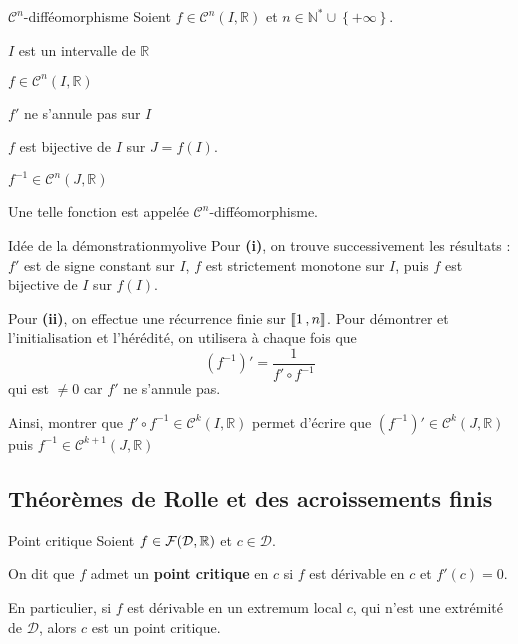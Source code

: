     \begin{prop}{$\mathcal{C}^n$-difféomorphisme}{}
        Soient $f \in \mathcal{C}^n(I, \mathbb{R})$ et $n \in \mathbb{N}^* \cup \left\{ +\infty \right\}$.
        \begin{suppose}
            \item $I$ est un intervalle de $\mathbb{R}$
            \item $f \in \mathcal{C}^n(I,\mathbb{R})$
            \item $f'$ ne s’annule pas sur $I$
        \end{suppose}
        \begin{alors}
            \item $f$ est bijective de $I$ sur $J = f(I)$.
            \item $ f^{-1} \in \mathcal{C}^n(J,\mathbb{R}) $
        \end{alors}
        Une telle fonction est appelée $\mathcal{C}^n$-difféomorphisme.
    \end{prop}

    \begin{demo}{Idée de la démonstration}{myolive}
        Pour \textbf{(i)}, on trouve successivement les résultats : $f'$ est de signe constant sur $I$, $f$ est strictement monotone sur $I$, puis $f$ est bijective de $I$ sur $f(I)$.
        
        Pour \textbf{(ii)}, on effectue une récurrence finie sur $\left\llbracket 1 \, , n \right\rrbracket$. Pour démontrer et l’initialisation et l’hérédité, on utilisera à chaque fois que \[ (f^{-1})' = \frac{1}{f' \circ f^{-1}} \] qui est $\neq 0$ car $f'$ ne s’annule pas.
        
        Ainsi, montrer que $f' \circ f^{-1} \in \mathcal{C}^k(I,\mathbb{R})$ permet d’écrire que $(f^{-1})' \in \mathcal{C}^k(J,\mathbb{R})$ puis $f^{-1} \in \mathcal{C}^{k+1}(J,\mathbb{R})$
    \end{demo}

\subsection{Théorèmes de Rolle et des acroissements finis}

    \begin{defitheo}{Point critique}{}
        Soient $f \in \mathcal{F}(\mathcal{D},\mathbb{R})$ et $c \in \mathcal{D}$.

        On dit que $f$ admet un \textbf{point critique} en $c$ si $f$ est dérivable en $c$ et $f'(c) = 0$.

        En particulier, si $f$ est dérivable en un extremum local $c$, qui n’est une extrémité de $\mathcal{D}$, alors $c$ est un point critique.
    \end{defitheo}

